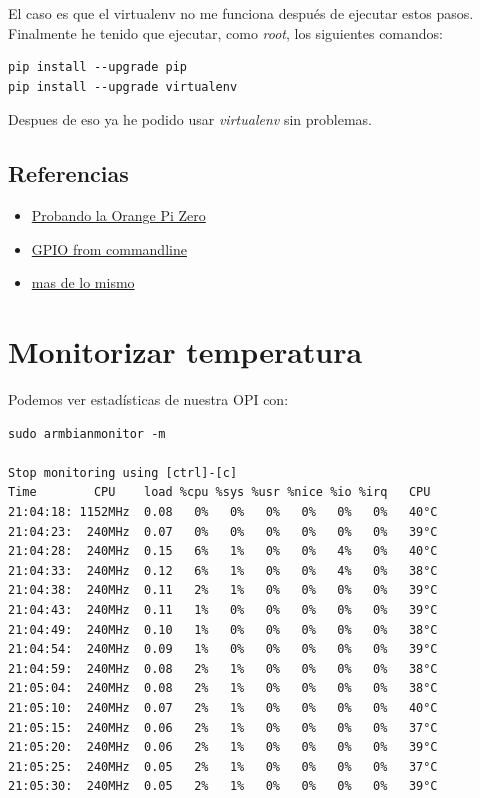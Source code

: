 \documentclass[12pt,spanish,]{scrartcl}
\providecommand{\tightlist}{%
  \setlength{\itemsep}{0pt}\setlength{\parskip}{0pt}}
\begin{document}
El caso es que el virtualenv no me funciona después de ejecutar estos
pasos. Finalmente he tenido que ejecutar, como \emph{root}, los
siguientes comandos:

\begin{verbatim}
pip install --upgrade pip
pip install --upgrade virtualenv
\end{verbatim}

Despues de eso ya he podido usar \emph{virtualenv} sin problemas.

\subsection{Referencias}\label{referencias}

\begin{itemize}
\tightlist
\item
  \href{http://harald.studiokubota.com/wordpress/index.php/2016/11/19/orange-pi-zero-neat/}{Probando
  la Orange Pi Zero}
\item
  \href{http://falsinsoft.blogspot.com.es/2012/11/access-gpio-from-linux-user-space.html}{GPIO
  from commandline}
\item
  \href{http://www.emcraft.com/stm32f429discovery/controlling-gpio-from-linux-user-space}{mas
  de lo mismo}
\end{itemize}

\section{Monitorizar temperatura}\label{monitorizar-temperatura}

Podemos ver estadísticas de nuestra OPI con:

\begin{verbatim}
sudo armbianmonitor -m

Stop monitoring using [ctrl]-[c]
Time        CPU    load %cpu %sys %usr %nice %io %irq   CPU
21:04:18: 1152MHz  0.08   0%   0%   0%   0%   0%   0%   40°C
21:04:23:  240MHz  0.07   0%   0%   0%   0%   0%   0%   39°C
21:04:28:  240MHz  0.15   6%   1%   0%   0%   4%   0%   40°C
21:04:33:  240MHz  0.12   6%   1%   0%   0%   4%   0%   38°C
21:04:38:  240MHz  0.11   2%   1%   0%   0%   0%   0%   39°C
21:04:43:  240MHz  0.11   1%   0%   0%   0%   0%   0%   39°C
21:04:49:  240MHz  0.10   1%   0%   0%   0%   0%   0%   38°C
21:04:54:  240MHz  0.09   1%   0%   0%   0%   0%   0%   39°C
21:04:59:  240MHz  0.08   2%   1%   0%   0%   0%   0%   38°C
21:05:04:  240MHz  0.08   2%   1%   0%   0%   0%   0%   38°C
21:05:10:  240MHz  0.07   2%   1%   0%   0%   0%   0%   40°C
21:05:15:  240MHz  0.06   2%   1%   0%   0%   0%   0%   37°C
21:05:20:  240MHz  0.06   2%   1%   0%   0%   0%   0%   39°C
21:05:25:  240MHz  0.05   2%   1%   0%   0%   0%   0%   37°C
21:05:30:  240MHz  0.05   2%   1%   0%   0%   0%   0%   39°C
\end{verbatim}
\end{document}
